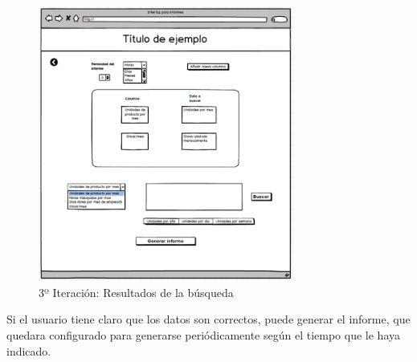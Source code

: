\begin{figure}[hp!]
    \centering
    \includegraphics[width=0.75\textwidth]{imaxes/iteracion3.4.png}
    \caption{3º Iteración: Resultados de la búsqueda}
    \label{fig:iteracion3.4}
\end{figure}

Si el usuario tiene claro que los datos son correctos, puede generar el informe, 
que quedara configurado para generarse periódicamente según el tiempo que le haya indicado.